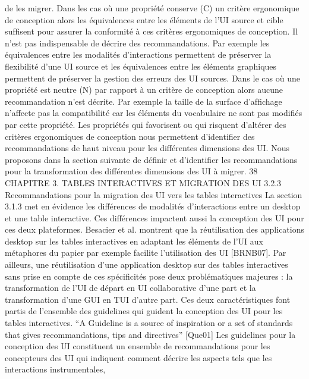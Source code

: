 \documentclass{article}
\begin{document}
de les migrer.
Dans les cas o\`{u} une propri\'{e}t\'{e} conserve (C) un crit\`{e}re ergonomique de conception alors les \'{e}quivalences entre les \'{e}l\'{e}ments de l’UI source et cible sufﬁsent pour assurer la conformit\'{e} \`{a} ces crit\`{e}res ergonomiques de conception. Il n’est pas indispensable de d\'{e}crire des recommandations. Par exemple les
\'{e}quivalences entre les modalit\'{e}s d’interactions permettent de pr\'{e}server la ﬂexibilit\'{e} d’une UI source
et les \'{e}quivalences entre les \'{e}l\'{e}ments graphiques permettent de pr\'{e}server la gestion des erreurs des UI
sources.
Dans le cas o\`{u} une propri\'{e}t\'{e} est neutre (N) par rapport \`{a} un crit\`{e}re de conception alors aucune
recommandation n’est d\'{e}crite. Par exemple la taille de la surface d’afﬁchage n’affecte pas la compatibilit\'{e} car les \'{e}l\'{e}ments du vocabulaire ne sont pas modiﬁ\'{e}s par cette propri\'{e}t\'{e}.
Les propri\'{e}t\'{e}s qui favorisent ou qui risquent d’alt\'{e}rer des crit\`{e}res ergonomiques de conception
nous permettent d’identiﬁer des recommandations de haut niveau pour les diff\'{e}rentes dimensions des
UI. Nous proposons dans la section suivante de d\'{e}ﬁnir et d’identiﬁer les recommandations pour la
transformation des diff\'{e}rentes dimensions des UI \`{a} migrer.
38
CHAPITRE 3. TABLES INTERACTIVES ET MIGRATION DES UI
3.2.3
Recommandations pour la migration des UI vers les tables interactives
La section 3.1.3 met en \'{e}vidence les diff\'{e}rences de modalit\'{e}s d’interactions entre un desktop
et une table interactive. Ces diff\'{e}rences impactent aussi la conception des UI pour ces deux plateformes. Besacier et al. montrent que la r\'{e}utilisation des applications desktop sur les tables interactives
en adaptant les \'{e}l\'{e}ments de l’UI aux m\'{e}taphores du papier par exemple facilite l’utilisation des UI
[BRNB07].
Par ailleurs, une r\'{e}utilisation d’une application desktop sur des tables interactives sans prise en
compte de ces sp\'{e}ciﬁcit\'{e}s pose deux probl\'{e}matiques majeures : la transformation de l’UI de d\'{e}part
en UI collaborative d’une part et la transformation d’une GUI en TUI d’autre part. Ces deux caract\'{e}ristiques font partis de l’ensemble des guidelines qui guident la conception des UI pour les tables
interactives.
“A Guideline is a source of inspiration or a set of standards that gives recommandations, tips and
directives” [Que01]
Les guidelines pour la conception des UI constituent un ensemble de recommandations pour les
concepteurs des UI qui indiquent comment d\'{e}crire les aspects tels que les interactions instrumentales,
\end{document}
